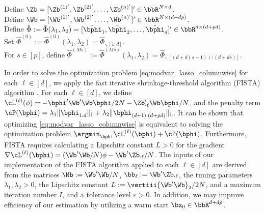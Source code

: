 \begin{singlespace}
	\begin{algorithm}
		\SetAlgoLined
		Define $\Zb = [\Zb^{(1)'}, \Zb^{(2)'}, \ldots, \Zb^{(n)'}]'\in\bbR^{N\times d}$.\\
		Define $\Wb = [\Wb^{(1)'}, \Wb^{(2)'}, \ldots, \Wb^{(n)'}]'\in\bbR^{N\times (d+dp)}$.\\
		Define $\hat\Phi:=\hat\Phi(\lambda_1,\lambda_2) = [\hat\bphi_1,\hat\bphi_2,\ldots, \hat\bphi_d]'\in\bbR^{d\times (d+pd)}$. \\
		Set $\hat\Phi^{(0)} := \hat\Phi^{(0)}(\lambda_1,\lambda_2) = \hat\Phi_{\cdot, [1:d]} $.\\
		For $s \in[p]$, define $\hat\Phi^{(M s)} := \hat\Phi^{(M s)}(\lambda_1,\lambda_2) = \hat\Phi_{\cdot, [(d+ d(s-1)):(d+ds)]} $.\\
		\caption{MOD-VAR.}\label{alg:MODVAR}
	\end{algorithm}
\end{singlespace}%

In order to solve the optimization problem \eqref{eq:modvar_lasso_columnwise} for each $\ell\in[d]$, we apply the fast iterative shrinkage-threshold algorithm (FISTA) algorithm  \citep{beck2009fast}. For each $\ell\in[d]$, we define $\cL^{(\ell)}(\phi) =   - \bphi'\Wb'\Wb \bphi / 2N - \Zb_{\cdot \ell}'\Wb \bphi / N$, and the penalty term  $\cP(\bphi) = \lambda_1\|\bphi_{1:d}\|_1 + \lambda_2\|\bphi_{(d+1):(d+pd)}\|_1 $. It can be shown that optimizing \eqref{eq:modvar_lasso_columnwise} is equivalent to solving the optimization problem $\argmin_{\bphi}\cL^{(\ell)}(\bphi) + \cP(\bphi)$.  Furthermore, FISTA requires calculating a Lipschitz constant $L>0$  for the gradient $\nabla\cL^{(\ell)}(\bphi) = ({\Wb'\Wb}/N) \phi - \Wb'\Zb_{\cdot \ell}/N$. The inputs of our implementation of the FISTA algorithm applied to each $\ell \in[d]$ are derived from the matrices $\Mb:= {\Wb'\Wb}/N$, $\bb_\ell := \Wb'\Zb_{\cdot \ell}$, the tuning parameters $\lambda_1,\lambda_2 > 0$, the Lipschitz constant $L  := \vertiii{\Wb'\Wb}_2/2N$, and a maximum iteration number $I$, and a tolerance level $\varepsilon > 0$. In addition, we may improve efficiency of our estimation by utilizing a warm start $\bx_0\in\bbR^{d+dp}$. 

